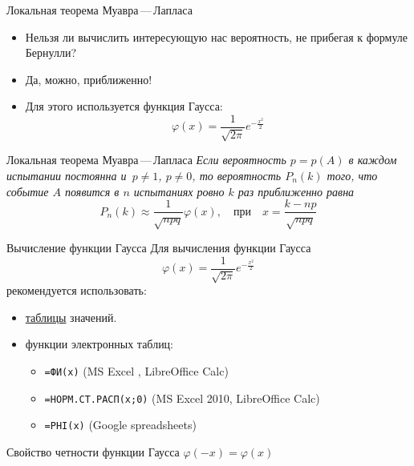 \documentclass[unicode,11pt,notheorems,xcolor=table]{beamer}
\begin{document}
\begin{frame}{Локальная теорема Муавра\,---\,Лапласа}{}
    \begin{itemize}
        \item Нельзя ли вычислить интересующую нас вероятность, не прибегая к формуле Бернулли? 
        \item Да, можно, приближенно!
        \item Для этого используется функция Гаусса:
        $$
             \varphi(x)= \frac{1}{\sqrt{2\pi}} e^{-\frac{x^2}{2}}
        $$
    \end{itemize}
   
    \begin{block}{Локальная теорема Муавра\,---\,Лапласа}
        \itshape
        Если вероятность $p=p(A)$ в каждом испытании постоянна и~$p\neq 1$, $p \neq 0$, то вероятность $P_n(k)$ того, что событие $A$ появится в $n$ испытаниях ровно $k$ раз приближенно равна
        $$
            P_n(k) \approx \frac{1}{\sqrt{npq}} \varphi(x), \quad\text{при}\quad x = \frac{k-np}{\sqrt{npq}}
        $$  

    \end{block}
\end{frame}
\begin{frame}{Вычисление функции Гаусса}{}
    Для вычисления функции Гаусса 
    $$
        \varphi(x)= \frac{1}{\sqrt{2\pi}} e^{-\frac{x^2}{2}}
    $$
    рекомендуется использовать:
    \begin{itemize}
        \item \href{https://cloud.mail.ru/public/5oAx/3MrM7rR4E}{таблицы} значений.
        \item функции электронных таблиц:
        \begin{itemize}
            \item \texttt{=ФИ(x)} \hfill (MS Excel , LibreOffice Calc)
            \item \texttt{=НОРМ.СТ.РАСП(x;0)} \hfill (MS Excel 2010, LibreOffice Calc)
            \item \texttt{=PHI(x)} \hfill (Google spreadsheets)
        \end{itemize}
        \end{itemize}
    \begin{block}{Свойство четности функции Гаусса}
        $\varphi(-x)=\varphi(x)$
    \end{block}
\end{frame}
\end{document}
